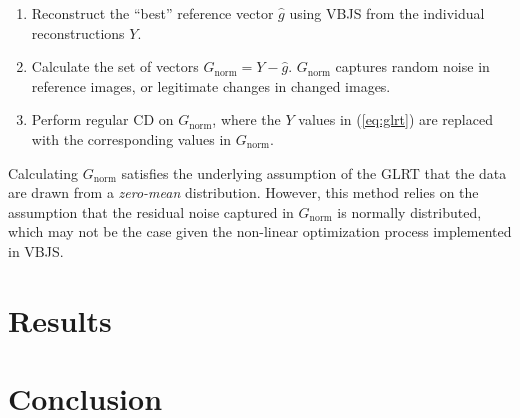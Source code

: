 \documentclass{article}
\begin{document}
\begin{enumerate}
    \item Reconstruct the ``best'' reference vector $\hat{g}$ using VBJS from the individual reconstructions $Y$.
    \item Calculate the set of vectors $G_\text{norm} = Y - \hat{g}$. $G_\text{norm}$ captures random noise in reference images, or legitimate changes in changed images.
    \item Perform regular CD on $G_\text{norm}$, where the $Y$ values in (\ref{eq:glrt}) are replaced with the corresponding values in $G_\text{norm}$.
\end{enumerate}

Calculating $G_\text{norm}$ satisfies the underlying assumption of the GLRT that the data are drawn from a \emph{zero-mean} distribution. However, this method relies on the assumption that the residual noise captured in $G_\text{norm}$ is normally distributed, which may not be the case given the non-linear optimization process implemented in VBJS.

\section{Results}


\section{Conclusion}




\end{document}
